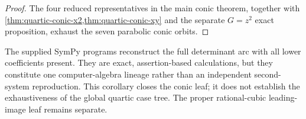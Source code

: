 \begin{proof}
The four reduced representatives in the main conic theorem, together with
\cref{thm:quartic-conic-x2,thm:quartic-conic-xy} and the separate
\(G=z^2\) exact proposition, exhaust the seven parabolic conic orbits.
\end{proof}

\begin{remark}
The supplied SymPy programs reconstruct the full determinant arc with all
lower coefficients present.  They are exact, assertion-based calculations,
but they constitute one computer-algebra lineage rather than an independent
second-system reproduction.  This corollary closes the conic leaf; it does
not establish the exhaustiveness of the global quartic case tree.  The proper
rational-cubic leading-image leaf remains separate.
\end{remark}
